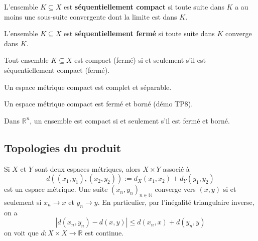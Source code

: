 \begin{definition}
    L'ensemble $K\subseteq X$ est \textbf{séquentiellement compact} si toute suite dans $K$ a au moins une sous-suite convergente dont la limite est dans $K$.
\end{definition}

\begin{definition}
    L'ensemble $K\subseteq X$ est \textbf{séquentiellement fermé} si toute suite dans $K$ converge dans $K$.
\end{definition}

\begin{theo}
    Tout ensemble $K\subseteq X$ est compact (fermé) si et seulement s'il est séquentiellement compact (fermé).
\end{theo}

\begin{theo}
    Un espace métrique compact est complet et séparable.
\end{theo}

\begin{theo}
    Un espace métrique compact est fermé et borné (démo TP8).
\end{theo}

\begin{theo}
    Dans $\mathbb{R}^n$, un ensemble est compact si et seulement s'il est fermé et borné.
\end{theo}

\subsection{Topologies du produit}

Si $X$ et $Y$ sont deux espaces métriques, alors $X\times Y$ associé à \[d((x_1,y_1),(x_2,y_2)) := d_X(x_1,x_2) + d_Y(y_1,y_2)\] est un espace métrique. Une suite $(x_n,y_n)_{n \in \mathbb{N}}$ converge vers $(x,y)$ si et seulement si $x_n\rightarrow x$ et $y_n\rightarrow y$. En particulier, par l'inégalité triangulaire inverse, on a \[|d(x_n,y_n) - d(x,y)| \leq d(x_n,x) + d(y_n,y)\] on voit que $d:X\times X \rightarrow \mathbb{R}$ est continue.

